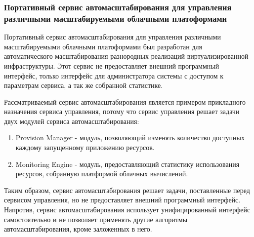 \subsubsection*{Портативный сервис автомасштабирования для управления различными масштабируемыми облачными платоформами}
Портативный сервис автомасштабирования для управления различными масштабируемыми облачными платоформами\cite{portable-autoscaler-for-managing-multi-cloud-elasticity} был разработан для автоматического масштабирования разнородных реализаций виртуализированной инфраструктуры.
Этот сервис не предоставляет внешний программный интерфейс, только интерфейс для администратора системы с доступом к параметрам сервиса, а так же собранной статистике.

Рассматриваемый сервис автомасштабирования является примером прикладного назначения сервиса управления, потому что сервис управления решает задачи двух модулей сервиса автомасштабирования:
\begin{enumerate}
    \item Provision Manager - модуль, позволяющий изменять количество доступных каждому запущенному приложению ресурсов.
    \item Monitoring Engine - модуль, предоставляющий статистику использования ресурсов, собранную платформой облачных вычислений.
\end{enumerate}

Таким образом, сервис автомасштабирования решает задачи, поставленные перед сервисом управления, но не предоставляет внешний программный интерфейс.
Напротив, сервис автомасштабирования использует унифицированный интерфейс самостоятельно и не позволяет применять другие алгоритмы автомасштабирования, кроме заложенных в него.